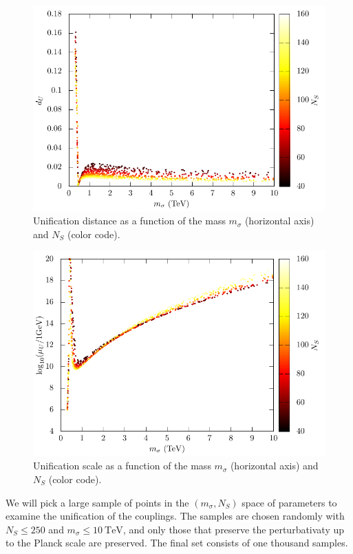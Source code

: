 \documentclass[aps,prd,preprintnumbers,nofootinbibn,twocolumn]{revtex4}
\begin{document}
\begin{figure}[t]
\centering
\includegraphics[width=\columnwidth]{GUTdistance}
\caption{Unification distance as a function of the mass $m_\sigma$ (horizontal axis) and $N_S$ (color code).}\label{fig:GUTdistance}
\end{figure}
\begin{figure}[t]
\centering
\includegraphics[width=\columnwidth]{GUTscale}
\caption{Unification scale as a function of the mass $m_\sigma$ (horizontal axis) and $N_S$ (color code).}\label{fig:GUTscale}
\end{figure}

We will pick a large sample of points in the $(m_\sigma, N_S)$ space of parameters to examine the unification of the couplings. The samples are chosen randomly with $N_S \leq 250$ and $m_\sigma \leq \SI{10}{\tera\electronvolt}$, and only those that preserve the perturbativaty up to the Planck scale are preserved. The final set consists of one thousand samples.
\end{document}
